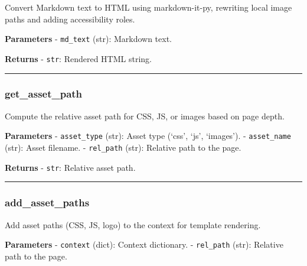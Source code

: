 Convert Markdown text to HTML using markdown-it-py, rewriting local
image paths and adding accessibility roles.

\textbf{Parameters} - \texttt{md\_text} (str): Markdown text.

\textbf{Returns} - \texttt{str}: Rendered HTML string.

\begin{center}\rule{0.5\linewidth}{0.5pt}\end{center}

\subsubsection{get\_asset\_path}\label{get_asset_path}

\begin{Shaded}
\begin{Highlighting}[]
\end{Highlighting}
\end{Shaded}

Compute the relative asset path for CSS, JS, or images based on page
depth.

\textbf{Parameters} - \texttt{asset\_type} (str): Asset type (`css',
`js', `images'). - \texttt{asset\_name} (str): Asset filename. -
\texttt{rel\_path} (str): Relative path to the page.

\textbf{Returns} - \texttt{str}: Relative asset path.

\begin{center}\rule{0.5\linewidth}{0.5pt}\end{center}

\subsubsection{add\_asset\_paths}\label{add_asset_paths}

\begin{Shaded}
\begin{Highlighting}[]
\end{Highlighting}
\end{Shaded}

Add asset paths (CSS, JS, logo) to the context for template rendering.

\textbf{Parameters} - \texttt{context} (dict): Context dictionary. -
\texttt{rel\_path} (str): Relative path to the page.

